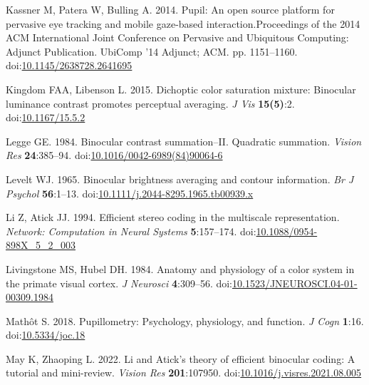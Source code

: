 \documentclass[
]{article}
\newlength{\cslhangindent}
\newlength{\cslentryspacingunit} %
\newenvironment{CSLReferences}[2] %
 {%
  \setlength{\parindent}{0pt}
  \ifodd #1
  \let\oldpar\par
  \def\par{\hangindent=\cslhangindent\oldpar}
  \fi
  \setlength{\parskip}{#2\cslentryspacingunit}
 }%
 {}
\begin{document}
\begin{CSLReferences}{1}{0}
\leavevmode{}%
Kassner M, Patera W, Bulling A. 2014. Pupil: An open source platform for pervasive eye tracking and mobile gaze-based interaction.Proceedings of the 2014 {ACM} International Joint Conference on Pervasive and Ubiquitous Computing: Adjunct Publication. UbiComp '14 Adjunct; {ACM}. pp. 1151--1160. doi:\href{https://doi.org/10.1145/2638728.2641695}{10.1145/2638728.2641695}

\leavevmode{}%
Kingdom FAA, Libenson L. 2015. Dichoptic color saturation mixture: Binocular luminance contrast promotes perceptual averaging. \emph{J Vis} \textbf{15(5)}:2. doi:\href{https://doi.org/10.1167/15.5.2}{10.1167/15.5.2}

\leavevmode{}%
Legge GE. 1984. Binocular contrast summation--II. Quadratic summation. \emph{Vision Res} \textbf{24}:385--94. doi:\href{https://doi.org/10.1016/0042-6989(84)90064-6}{10.1016/0042-6989(84)90064-6}

\leavevmode{}%
Levelt WJ. 1965. Binocular brightness averaging and contour information. \emph{Br J Psychol} \textbf{56}:1--13. doi:\href{https://doi.org/10.1111/j.2044-8295.1965.tb00939.x}{10.1111/j.2044-8295.1965.tb00939.x}

\leavevmode{}%
Li Z, Atick JJ. 1994. Efficient stereo coding in the multiscale representation. \emph{Network: Computation in Neural Systems} \textbf{5}:157--174. doi:\href{https://doi.org/10.1088/0954-898X_5_2_003}{10.1088/0954-898X\_5\_2\_003}

\leavevmode{}%
Livingstone MS, Hubel DH. 1984. Anatomy and physiology of a color system in the primate visual cortex. \emph{J Neurosci} \textbf{4}:309--56. doi:\href{https://doi.org/10.1523/JNEUROSCI.04-01-00309.1984}{10.1523/JNEUROSCI.04-01-00309.1984}

\leavevmode{}%
Mathôt S. 2018. Pupillometry: Psychology, physiology, and function. \emph{J Cogn} \textbf{1}:16. doi:\href{https://doi.org/10.5334/joc.18}{10.5334/joc.18}

\leavevmode{}%
May K, Zhaoping L. 2022. Li and {Atick's} theory of efficient binocular coding: A tutorial and mini-review. \emph{Vision Res} \textbf{201}:107950. doi:\href{https://doi.org/10.1016/j.visres.2021.08.005}{10.1016/j.visres.2021.08.005}


\end{CSLReferences}
\end{document}
